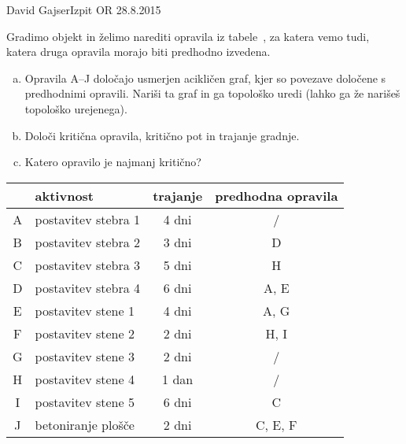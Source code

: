 \begin{naloga}{David Gajser}{Izpit OR 28.8.2015}
\begin{vprasanje}
Gradimo objekt in želimo narediti opravila iz tabele~\tab,
za katera vemo tudi, katera druga opravila morajo biti predhodno izvedena.
\begin{enumerate}[(a)]
\item Opravila A--J določajo usmerjen acikličen graf,
kjer so povezave določene s predhodnimi opravili.
Nariši ta graf in ga topološko uredi
(lahko ga že narišeš topološko urejenega).

\item Določi kritična opravila, kritično pot in trajanje gradnje.

\item Katero opravilo je najmanj kritično?
\end{enumerate}

\begin{tabela}
\begin{tabular}{c|l|c|c}
& aktivnost & trajanje & predhodna opravila \\
\hline
A & postavitev stebra 1 & 4 dni & / \\
B & postavitev stebra 2 & 3 dni & D \\
C & postavitev stebra 3 & 5 dni & H \\
D & postavitev stebra 4 & 6 dni & A, E \\
E & postavitev stene 1  & 4 dni & A, G \\
F & postavitev stene 2  & 2 dni & H, I \\
G & postavitev stene 3  & 2 dni & / \\
H & postavitev stene 4  & 1 dan & / \\
I & postavitev stene 5  & 6 dni & C \\
J & betoniranje plošče  & 2 dni & C, E, F \\
\end{tabular}
\end{tabela}
\end{vprasanje}
\begin{odgovor}
\end{odgovor}
\end{naloga}
